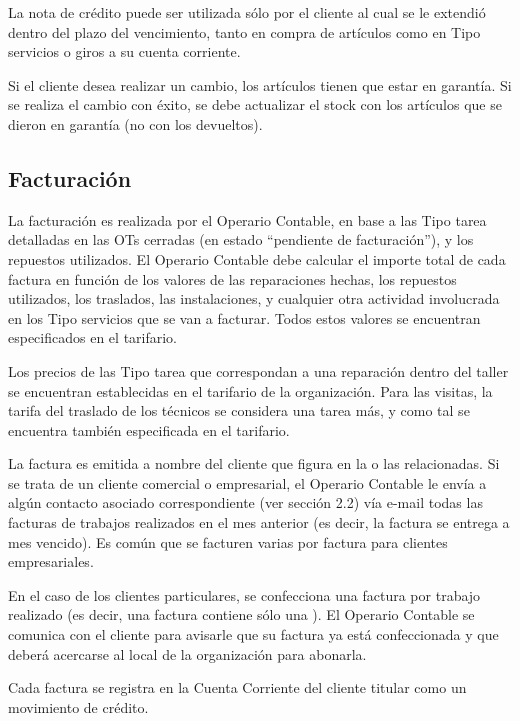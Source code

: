 \documentclass[12pt]{extarticle}
\begin{document}
\begin{spacing}{1.2}
    La nota de crédito puede ser utilizada sólo por el cliente al cual se le extendió dentro del plazo del vencimiento, tanto en compra de artículos como en Tipo servicios o giros a su cuenta corriente.

    Si el cliente desea realizar un cambio, los artículos tienen que estar en garantía. Si se realiza el cambio con éxito, se debe actualizar el stock con los artículos que se dieron en garantía (no con los devueltos).

    \subsection{Facturación}


    La facturación es realizada por el Operario Contable, en base a las Tipo tarea detalladas en las OTs{} cerradas (en estado ``pendiente de facturación''), y los repuestos utilizados. El Operario Contable debe calcular el importe total de cada factura en función de los valores de las reparaciones hechas, los repuestos utilizados, los traslados, las instalaciones, y cualquier otra actividad involucrada en los Tipo servicios que se van a facturar. Todos estos valores se encuentran especificados en el tarifario.
    
    Los precios de las Tipo tarea que correspondan a una reparación dentro del taller se encuentran establecidas en el tarifario de la organización. Para las visitas, la tarifa del traslado de los técnicos se considera una tarea más, y como tal se encuentra también especificada en el tarifario.

    La factura es emitida a nombre del cliente que figura en la o las \OTs{} relacionadas. Si se trata de un cliente comercial o empresarial, el Operario Contable le envía a algún contacto asociado correspondiente (ver sección 2.2) vía e-mail todas las facturas de trabajos realizados en el mes anterior (es decir, la factura se entrega a mes vencido). Es común que se facturen varias \OTs{} por factura para clientes empresariales.
    
    En el caso de los clientes particulares, se confecciona una factura por trabajo realizado (es decir, una factura contiene sólo una \OT{}). El Operario Contable se comunica con el cliente para avisarle que su factura ya está confeccionada y que deberá acercarse al local de la organización para abonarla.
   
    Cada factura se registra en la Cuenta Corriente del cliente titular como un movimiento de crédito. \\


\end{spacing}
\end{document}

